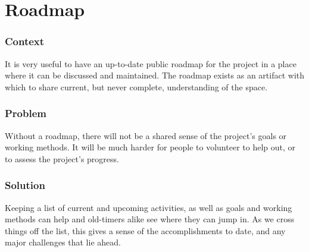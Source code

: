 \section{Roadmap} \label{sec:Roadmap}

\subsubsection*{Context} It is very useful to have an up-to-date public roadmap for the project in a place where it can be discussed and maintained. The roadmap exists as an artifact with which to share current, but never complete, understanding of the space.

\subsubsection*{Problem} Without a roadmap, there will not be a shared sense of the project's goals or working methods. It will be much harder for people to volunteer to help out, or to assess the project's progress.

\subsubsection*{Solution} Keeping a list of current and upcoming activities, as well as goals and working methods can help  and old-timers alike see where they can jump in. As we cross things off the list, this gives a sense of the accomplishments to date, and any major challenges that lie ahead.

